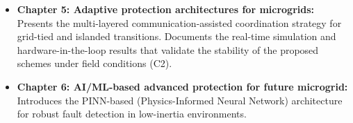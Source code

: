 \begin{itemize}
\item \textbf{Chapter 5: Adaptive protection architectures for microgrids:} Presents the multi-layered communication-assisted coordination strategy for grid-tied and islanded transitions. Documents the real-time simulation and hardware-in-the-loop results that validate the stability of the proposed schemes under field conditions (C2).


\item \textbf{Chapter 6: AI/ML-based advanced protection for future microgrid:} Introduces the PINN-based (Physics-Informed Neural Network) architecture for robust fault detection in low-inertia environments.


\end{itemize}
